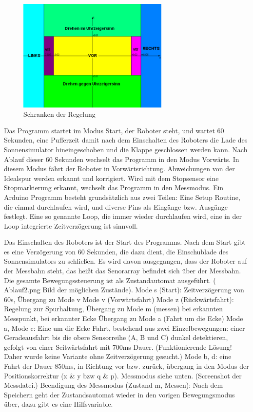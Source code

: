 \documentclass[a4paper,bibtotoc,oneside]{scrbook}
\begin{document}
\begin{figure}[htbp]
\centering
\includegraphics[width=75mm]{img/schranken.png}
\caption[Schranken der Regelung]{Schranken der Regelung}\label{schr}
\end{figure}

Das Programm startet im Modus Start, der Roboter steht, und wartet 60 Sekunden, eine Pufferzeit damit nach dem Einschalten des Roboters die Lade des Sonnensimulator hineingeschoben und die Klappe geschlossen werden kann.
Nach Ablauf dieser 60 Sekunden wechselt das Programm in den Modus Vorwärts. In diesem Modus fährt der Roboter in Vorwärtsrichtung. Abweichungen von der Idealspur werden erkannt und korrigiert. Wird mit dem Stopsensor eine Stopmarkierung erkannt, wechselt das Programm in den Messmodus. 
Ein Arduino Programm besteht grundsätzlich aus zwei Teilen: 
Eine Setup Routine, die einmal durchlaufen wird, und diverse Pins als Eingänge bzw. Ausgänge festlegt.
Eine so genannte Loop, die immer wieder durchlaufen wird, eine in der Loop integrierte Zeitverzögerung ist sinnvoll. 

Das Einschalten des Roboters ist der Start des Programms. Nach dem Start gibt es eine Verzögerung von 60 Sekunden, die dazu dient, die Einschublade des Sonnensimulators zu schließen. Es wird davon ausgegangen, dass der Roboter auf der Messbahn steht, das heißt das Senorarray befindet sich über der Messbahn.
Die gesamte Bewegungssteuerung ist als Zustandautomat ausgeführt. ( Ablauf2.png Bild der möglichen Zustände).
Mode s (Start): Zeitverzögerung von 60s, Übergang zu Mode v
Mode v (Vorwärtsfahrt) Mode z (Rückwärtsfahrt): Regelung zur Spurhaltung, Übergang zu Mode m (messen) bei erkannten Messpunkt, bei erkannter Ecke Übergang zu Mode a (Fahrt um die Ecke)
Mode a, Mode c: Eine um die Ecke Fahrt, bestehend aus zwei Einzelbewegungen: einer Geradeausfahrt bis die obere Sensorreihe (A, B und C) dunkel detektieren, gefolgt von einer Seitwärtsfahrt mit 700ms Dauer. (Funktionierende Lösung! Daher wurde keine Variante ohne Zeitverzögerung gesucht.)
Mode b, d: eine Fahrt der Dauer 850ms, in Richtung vor bzw. zurück, übergang in den Modus der Positionskorrektur (x \& y bzw q \& p).
Messmodus siehe unten. (Screenshot der Messdatei.)
Beendigung des Messmodus (Zustand m, Messen): Nach dem Speichern geht der Zustandsautomat wieder in den vorigen Bewegungsmodus über, dazu gibt es eine Hilfsvariable.
\end{document}
